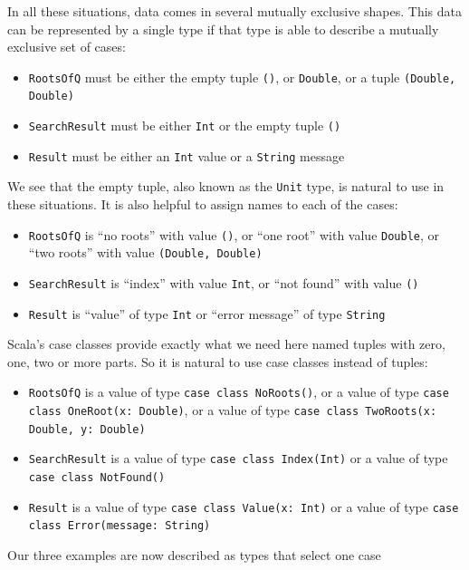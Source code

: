 In all these situations, data comes in several mutually exclusive
shapes. This data can be represented by a single type if that type
is able to describe a mutually exclusive set of cases:
\begin{itemize}
\item \lstinline!RootsOfQ! must be either the empty tuple \lstinline!()!,
or \lstinline!Double!, or a tuple \lstinline!(Double, Double)!
\item \lstinline!SearchResult! must be either \lstinline!Int! or the empty
tuple \lstinline!()!
\item \lstinline!Result! must be either an \lstinline!Int! value or a
\lstinline!String! message
\end{itemize}
We see that the empty tuple, also known as the \lstinline!Unit! type,
is natural to use in these situations. It is also helpful to assign
names to each of the cases:
\begin{itemize}
\item \lstinline!RootsOfQ! is \textsf{``}no roots\textsf{''} with value \lstinline!()!,
or \textsf{``}one root\textsf{''} with value \lstinline!Double!, or \textsf{``}two roots\textsf{''}
with value \lstinline!(Double, Double)!
\item \lstinline!SearchResult! is \textsf{``}index\textsf{''} with value \lstinline!Int!,
or \textsf{``}not found\textsf{''} with value \lstinline!()!
\item \lstinline!Result! is \textsf{``}value\textsf{''} of type \lstinline!Int! or \textsf{``}error
message\textsf{''} of type \lstinline!String!
\end{itemize}
Scala\textsf{'}s case classes provide exactly what we need here \textemdash{}
named tuples with zero, one, two or more parts. So it is natural to
use case classes instead of tuples:
\begin{itemize}
\item \lstinline!RootsOfQ! is a value of type \lstinline!case class NoRoots()!,
or a value of type \lstinline!case class OneRoot(x: Double)!, or
a value of type \lstinline!case class TwoRoots(x: Double, y: Double)!
\item \lstinline!SearchResult! is a value of type \lstinline!case class Index(Int)!
or a value of type \lstinline!case class NotFound()!
\item \lstinline!Result! is a value of type \lstinline!case class Value(x: Int)!
or a value of type \lstinline!case class Error(message: String)!
\end{itemize}
Our three examples are now described as types that select one case
